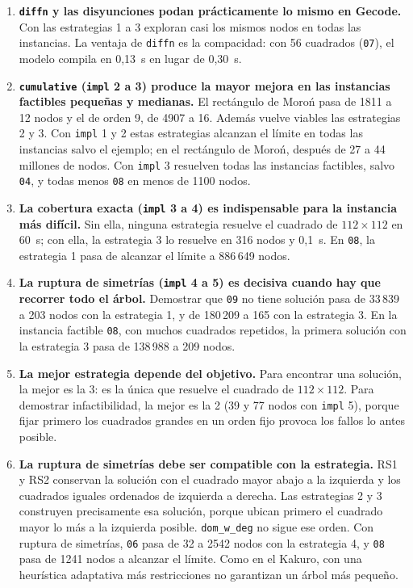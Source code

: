 \begin{enumerate}
    \item \textbf{\texttt{diffn} y las disyunciones podan prácticamente lo mismo en Gecode.} Con las estrategias 1 a 3 exploran casi los mismos nodos en todas las instancias. La ventaja de \texttt{diffn} es la compacidad: con 56 cuadrados (\texttt{07}), el modelo compila en 0,13~s en lugar de 0,30~s.
    \item \textbf{\texttt{cumulative} (\texttt{impl} 2 a 3) produce la mayor mejora en las instancias factibles pequeñas y medianas.} El rectángulo de Moroń pasa de 1811 a 12 nodos y el de orden 9, de 4907 a 16. Además vuelve viables las estrategias 2 y 3. Con \texttt{impl} 1 y 2 estas estrategias alcanzan el límite en todas las instancias salvo el ejemplo; en el rectángulo de Moroń, después de 27 a 44 millones de nodos. Con \texttt{impl} 3 resuelven todas las instancias factibles, salvo \texttt{04}, y todas menos \texttt{08} en menos de 1100 nodos.
    \item \textbf{La cobertura exacta (\texttt{impl} 3 a 4) es indispensable para la instancia más difícil.} Sin ella, ninguna estrategia resuelve el cuadrado de $112 \times 112$ en 60~s; con ella, la estrategia 3 lo resuelve en 316 nodos y 0,1~s. En \texttt{08}, la estrategia 1 pasa de alcanzar el límite a 886\,649 nodos.
    \item \textbf{La ruptura de simetrías (\texttt{impl} 4 a 5) es decisiva cuando hay que recorrer todo el árbol.} Demostrar que \texttt{09} no tiene solución pasa de 33\,839 a 203 nodos con la estrategia 1, y de 180\,209 a 165 con la estrategia 3. En la instancia factible \texttt{08}, con muchos cuadrados repetidos, la primera solución con la estrategia 3 pasa de 138\,988 a 209 nodos.
    \item \textbf{La mejor estrategia depende del objetivo.} Para encontrar una solución, la mejor es la 3: es la única que resuelve el cuadrado de $112 \times 112$. Para demostrar infactibilidad, la mejor es la 2 (39 y 77 nodos con \texttt{impl} 5), porque fijar primero los cuadrados grandes en un orden fijo provoca los fallos lo antes posible.
    \item \textbf{La ruptura de simetrías debe ser compatible con la estrategia.} RS1 y RS2 conservan la solución con el cuadrado mayor abajo a la izquierda y los cuadrados iguales ordenados de izquierda a derecha. Las estrategias 2 y 3 construyen precisamente esa solución, porque ubican primero el cuadrado mayor lo más a la izquierda posible. \texttt{dom\_w\_deg} no sigue ese orden. Con ruptura de simetrías, \texttt{06} pasa de 32 a 2542 nodos con la estrategia 4, y \texttt{08} pasa de 1241 nodos a alcanzar el límite. Como en el Kakuro, con una heurística adaptativa más restricciones no garantizan un árbol más pequeño.
\end{enumerate}

